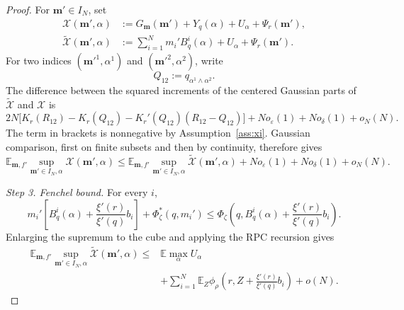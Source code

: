 \documentclass[a4paper,10pt,reqno]{amsart}
\numberwithin{equation}{section}
\newcommand{\ve}{\varepsilon}
\newcommand{\dE}{\mathbb{E}}%
\newcommand{\bfm}{\mathbf{m}}
\begin{document}
\begin{proof}
		For \(\bfm'\in I_N\), set
		\[
		\begin{aligned}
			\mathcal X(\bfm',\alpha)
			&:=
			G_\bfm(\bfm')
			+Y_q(\alpha)+U_\alpha+\Psi_r(\bfm'),\\
			\widetilde{\mathcal X}(\bfm',\alpha)
			&:=
			\sum_{i=1}^N m_i'B_q^i(\alpha)
			+U_\alpha+\Psi_r(\bfm').
		\end{aligned}
		\]
		For two indices \((\bfm'^1,\alpha^1)\) and
		\((\bfm'^2,\alpha^2)\), write
		\[
		Q_{12}:=q_{\alpha^1\wedge\alpha^2}.
		\]
		The difference between the squared increments of the centered Gaussian
		parts of \(\widetilde{\mathcal X}\) and \(\mathcal X\) is
		\[
		2N\bigl[
		K_r(R_{12})-K_r(Q_{12})
		-K_r'(Q_{12})(R_{12}-Q_{12})
		\bigr]
		+N o_\ve(1)+N o_\delta(1)+o_N(N).
		\]
		The term in brackets is nonnegative by
		Assumption~\ref{ass:xi}. Gaussian comparison, first on finite subsets
		and then by continuity, therefore gives
		\[
		\dE_{\bfm,f'}
		\sup_{\bfm'\in I_N,\alpha}\mathcal X(\bfm',\alpha)
		\le
		\dE_{\bfm,f'}
		\sup_{\bfm'\in I_N,\alpha}\widetilde{\mathcal X}(\bfm',\alpha)
		+N o_\ve(1)+N o_\delta(1)+o_N(N).
		\]
		
		\medskip\noindent\emph{Step 3. Fenchel bound.}
		For every \(i\),
		\[
		m_i'
		\left[
		B_q^i(\alpha)+\frac{\xi'(r)}{\xi'(q)}b_i
		\right]
		+\Phi_\zeta^*(q,m_i')
		\le
		\Phi_\zeta\left(
		q,
		B_q^i(\alpha)+\frac{\xi'(r)}{\xi'(q)}b_i
		\right).
		\]
		Enlarging the supremum to the cube and applying the RPC recursion gives
		\[
		\begin{aligned}
			\dE_{\bfm,f'}
			\sup_{\bfm'\in I_N,\alpha}\widetilde{\mathcal X}(\bfm',\alpha)
			\le{}&
			\dE\max_\alpha U_\alpha\\
			&+
			\sum_{i=1}^N
			\dE_Z\phi_\rho\left(
			r,Z+\frac{\xi'(r)}{\xi'(q)}b_i
			\right)
			+o(N).
		\end{aligned}
		\]
		

\end{proof}
\end{document}
